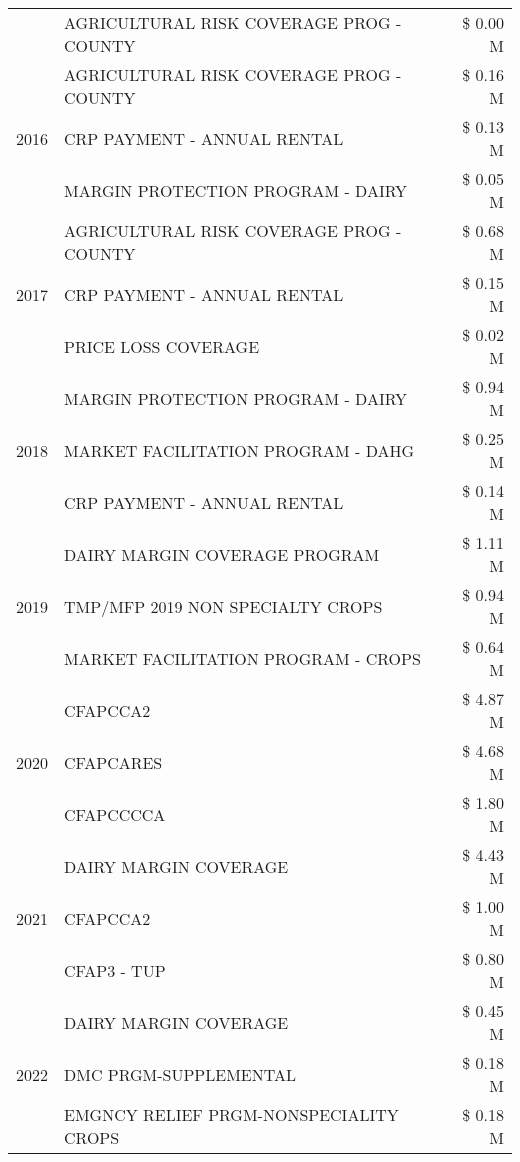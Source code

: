 \begin{tabular}{llr}
 & AGRICULTURAL RISK COVERAGE PROG - COUNTY & \$ 0.00 M \\
\cline{1-3}
\multirow[t]{3}{*}{2016} & AGRICULTURAL RISK COVERAGE PROG - COUNTY & \$ 0.16 M \\
 & CRP PAYMENT - ANNUAL RENTAL & \$ 0.13 M \\
 & MARGIN PROTECTION PROGRAM - DAIRY & \$ 0.05 M \\
\cline{1-3}
\multirow[t]{3}{*}{2017} & AGRICULTURAL RISK COVERAGE PROG - COUNTY & \$ 0.68 M \\
 & CRP PAYMENT - ANNUAL RENTAL & \$ 0.15 M \\
 & PRICE LOSS COVERAGE & \$ 0.02 M \\
\cline{1-3}
\multirow[t]{3}{*}{2018} & MARGIN PROTECTION PROGRAM - DAIRY & \$ 0.94 M \\
 & MARKET FACILITATION PROGRAM - DAHG & \$ 0.25 M \\
 & CRP PAYMENT - ANNUAL RENTAL & \$ 0.14 M \\
\cline{1-3}
\multirow[t]{3}{*}{2019} & DAIRY MARGIN COVERAGE PROGRAM & \$ 1.11 M \\
 & TMP/MFP 2019 NON SPECIALTY CROPS & \$ 0.94 M \\
 & MARKET FACILITATION PROGRAM - CROPS & \$ 0.64 M \\
\cline{1-3}
\multirow[t]{3}{*}{2020} & CFAPCCA2 & \$ 4.87 M \\
 & CFAPCARES & \$ 4.68 M \\
 & CFAPCCCCA & \$ 1.80 M \\
\cline{1-3}
\multirow[t]{3}{*}{2021} & DAIRY MARGIN COVERAGE & \$ 4.43 M \\
 & CFAPCCA2 & \$ 1.00 M \\
 & CFAP3 - TUP & \$ 0.80 M \\
\cline{1-3}
\multirow[t]{3}{*}{2022} & DAIRY MARGIN COVERAGE & \$ 0.45 M \\
 & DMC PRGM-SUPPLEMENTAL & \$ 0.18 M \\
 & EMGNCY RELIEF PRGM-NONSPECIALITY CROPS & \$ 0.18 M \\
\cline{1-3}
\bottomrule
\end{tabular}
